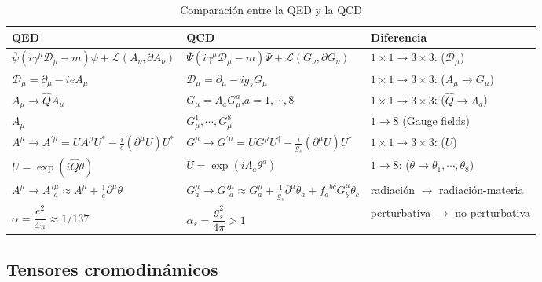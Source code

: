 \begin{frame}
  \begin{table}
    \centering
    \small
    \begin{tabular}{l|l|l}
      QED & QCD & Diferencia\\\hline
$      \overline{\psi}\left(i\gamma^\mu\mathcal{D}_\mu-m\right)\psi +\mathcal{L} \left(A_{\nu},\partial A_{\nu}  \right)$ & $      \overline{\Psi}\left(i\gamma^\mu\mathcal{D}_\mu-m\right)\Psi +\mathcal{L} \left(G_{\nu},\partial G_{\nu}  \right)$ & $1\times 1 \to 3\times 3$: ($\mathcal{D}_{\mu}$)\\ 
$\mathcal{D}_{\mu}=\partial_{\mu}-i e A_{\mu}$ & $\mathcal{D}_{\mu}=\partial_{\mu}-i g_s G_{\mu}$ & $1\times 1 \to 3\times 3$: ($A_{\mu}\to G_{\mu}$)\\ 
$A_{\mu}\to \widehat{Q}A_{\mu}$ & $G_{\mu}=\Lambda_{a} G_{\mu}^{a}$,\qquad $a=1,\cdots,8$ & $1\times 1 \to 3\times 3$: ($\widehat{Q}\to\Lambda_{a}$)\\ 
$A_{\mu}$&$ G_{\mu}^1,\cdots ,G_{\mu}^8$& $1\to 8$ (Gauge fields)\\
$    {A}^\mu\to {A}^{\prime\mu}=U{A}^\mu U^{*}-\frac{i}{e}\left(\partial^\mu U\right)U^*$&
$ {G}^\mu\to {G}^{\prime\mu}=U{G}^\mu U^{\dagger}-\frac{i}{g_s}\left(\partial^\mu U\right)U^\dagger$
&$1\times 1 \to 3\times 3$: ($U$)\\ 
$U=\exp(i\widehat{Q}\theta)$ & $U=\exp(i\Lambda_{a}\theta^{a})$& $1\to 8$: ($\theta\to\theta_{1},\cdots,\theta_{8}$) \\
      $A^\mu\to {A'}^\mu_a\approx A^\mu+\frac{1}{e}\partial^\mu\theta$ &
$G^\mu_a\to {G'}^\mu_a\approx G^\mu_a+\frac{1}{g_s}\partial^\mu\theta_a+{f_a}^{bc}G^\mu_b\theta_c$ &\parbox{3.5cm}{radiación $\to$ ra\-dia\-ción\--ma\-teria}  \\
$\alpha=\dfrac{e^2}{4\pi}\approx 1/137$ & $\alpha_s=\dfrac{g_s^2}{4\pi}>1$ & \parbox{3.5cm}{perturbativa $\to$ no per\-tur\-ba\-ti\-va}  \\
    \end{tabular}
    \caption{Comparación entre la QED y la QCD}
  \end{table}
\end{frame}


\subsection{Tensores cromodinámicos}



